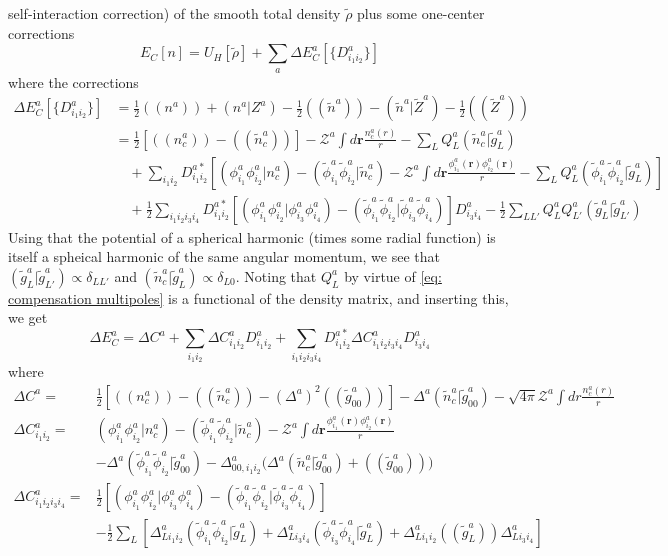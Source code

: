 \documentclass[a4paper]{article}
\newcommand{\s}[1]{\tilde{#1}}
\newcommand{\br}{\mathbf{r}}
\newcommand{\Z}{\mathcal{Z}}
\begin{document}
self-interaction correction) of the smooth total density $\s{\rho}$
plus some one-center corrections
%
\begin{equation}
   E_C[n] = U_H[\s{\rho}] + \sum_a \Delta E_C^a[\{D^a_{i_1i_2}\}]
\end{equation}
%
where the corrections
%
\begin{align*}
  \Delta E_C^a[\{D^a_{i_1i_2}\}] &= \tfrac{1}{2} ((n^a)) + (n^a|Z^a) - \tfrac{1}{2} ((\s{n}^a)) - (\s{n}^a| \s{Z}^a) - \tfrac{1}{2} ((\s{Z}^a))\\
  &= \tfrac{1}{2} \left[((n_c^a)) - ((\s{n}_c^a))\right] - \Z^a\int d\br \frac{n_c^a(r)}{r} - \sum_L Q_L^a(\s{n}_c^a|\s{g}_L^a)\\
  &\quad+ \sum_{i_1i_2} D^{a*}_{i_1i_2}\left[ (\phi_{i_1}^a\phi_{i_2}^{a}|n_c^a) - (\s{\phi}_{i_1}^a\s{\phi}_{i_2}^{a}|\s{n}_c^a) - \Z^a\int d\br \frac{\phi_{i_1}^{a}(\br)\phi_{i_2}^{a}(\br)}{r} -\sum_L Q_L^a(\s{\phi}_{i_1}^a\s{\phi}_{i_2}^{a}|\s{g}_L^a)\right] \\
  &\quad+ \frac{1}{2}\sum_{i_1i_2i_3i_4} D^{a*}_{i_1i_2}\left[(\phi_{i_1}^a\phi_{i_2}^{a}|\phi_{i_3}^a\phi_{i_4}^{a}) - (\s{\phi}_{i_1}^a\s{\phi}_{i_2}^{a}|\s{\phi}_{i_3}^a\s{\phi}_{i_4}^{a}) \right]D^{a}_{i_3i_4} - \frac{1}{2}\sum_{LL'}Q_L^aQ_{L'}^a (\s{g}_L^a|\s{g}_{L'}^a)
\end{align*}
%
Using that the potential of a spherical harmonic (times some radial
function) is itself a spheical harmonic of the same angular momentum,
we see that $(\s{g}_L^a|\s{g}_{L'}^a) \propto \delta_{LL'}$ and
$(\s{n}_c^a|\s{g}_L^a) \propto \delta_{L0}$. Noting that $Q_L^a$ by
virtue of \ref{eq: compensation multipoles} is a functional of the
density matrix, and inserting this, we get
%
\begin{equation}
  \Delta E_C^a = \Delta C^a + \sum_{i_1i_2} \Delta C^a_{i_1i_2} D^a_{i_1i_2} + \sum_{i_1i_2i_3i_4} D^{a*}_{i_1i_2} \Delta C^a_{i_1i_2i_3i_4} D^a_{i_3i_4}
\end{equation}
%
where
\begin{align}
  \Delta C^a =& \tfrac{1}{2} \left[((n_c^a)) - ((\s{n}_c^a)) - (\Delta^a)^2 ((\s{g}^a_{00}))\right] - \Delta^a (\s{n}_c^a|\s{g}_{00}^a) - \sqrt{4\pi}\Z^a \int dr \frac{n_c^a(r)}{r}\label{eq:coulom tensor 0}\\
  \Delta C^a_{i_1i_2} =& (\phi_{i_1}^a\phi_{i_2}^{a}|n_c^a) - (\s{\phi}_{i_1}^a\s{\phi}_{i_2}^{a}|\s{n}_c^a) - \Z^a\int d\br \frac{\phi_{i_1}^{a}(\br)\phi_{i_2}^{a}(\br)}{r} \nonumber \\
  &- \Delta^a (\s{\phi}_{i_1}^a\s{\phi}_{i_2}^{a}|\s{g}_{00}^a) - \Delta^a_{00,i_1i_2}\Big( \Delta^a (\s{n}_c^a|\s{g}_{00}^a) + ((\s{g}^a_{00})) \Big)\label{eq:coulom tensor 1}\\
  \Delta C^a_{i_1i_2i_3i_4} =& \tfrac{1}{2} \left[(\phi_{i_1}^a\phi_{i_2}^{a} | \phi_{i_3}^a\phi_{i_4}^{a}) - (\s{\phi}_{i_1}^a\s{\phi}_{i_2}^{a}|\s{\phi}_{i_3}^a\s{\phi}_{i_4}^{a}) \right] \nonumber\\
  & -\tfrac{1}{2}\sum_L \left[ \Delta^a_{Li_1i_2}(\s{\phi}_{i_1}^a\s{\phi}_{i_2}^{a}|\s{g}_L^a) + \Delta^a_{Li_3i_4}(\s{\phi}_{i_3}^a\s{\phi}_{i_4}^{a}|\s{g}_L^a) + \Delta^a_{Li_1i_2}((\s{g}^a_L))\Delta^a_{Li_3i_4} \right]\label{eq:coulom tensor 2}
\end{align}
\end{document}
